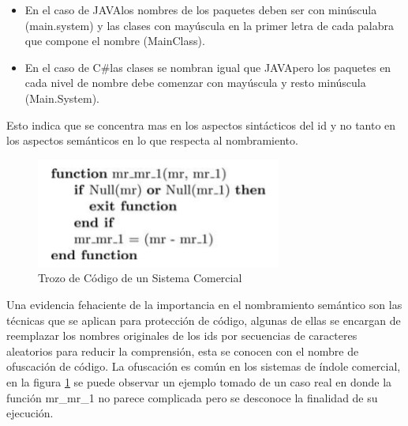 \documentclass[12pt]{report}
\begin{document}
\begin{itemize}
\itemsep0em%
\item En el caso de JAVA\texttrademark los nombres de los paquetes deben ser con minúscula (main.system) y las clases con mayúscula en la primer letra de cada palabra que compone el nombre (MainClass).

\item En el caso de C\#\texttrademark las clases se nombran igual que JAVA\texttrademark pero los paquetes en cada nivel de nombre debe comenzar con mayúscula y resto minúscula (Main.System).
\end{itemize}

Esto indica que se concentra mas en los aspectos sintácticos del id y no tanto en los aspectos semánticos en lo que respecta al nombramiento. 




\begin{figure}[t] %
\centering
\includegraphics[scale= 0.70]{./idd_1.png}
\caption{Trozo de Código de un Sistema Comercial}
\label{captura2}
\end{figure} 

Una evidencia fehaciente de la importancia en el nombramiento semántico son las técnicas que se aplican para protección de código, algunas de ellas se encargan de reemplazar los nombres originales de los ids por secuencias de caracteres aleatorios 
para reducir la comprensión, esta se conocen con el nombre de ofuscación de código. La ofuscación es común en los sistemas de índole comercial, en la figura \ref{captura2} se puede observar un ejemplo tomado de un caso real en donde la función \textsf{mr\_mr\_1} no parece complicada pero se desconoce la finalidad de su ejecución\cite{DFPM05}.
\end{document}

